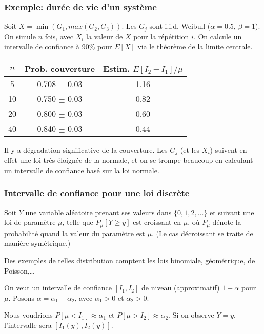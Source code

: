\documentclass[t,usepdftitle=false]{beamer}
\begin{document}
\begin{frame}
\frametitle{Exemple: durée de vie d'un système}

Soit $X = \min(G_1, max(G_2,G_3))$.
Les $G_j$ sont i.i.d. Weibull ($\alpha = 0.5$, $\beta= 1$).
On simule $n$ fois, avec $X_i$ la valeur de $X$ pour la répétition $i$.
On calcule un intervalle de confiance à 90\% pour $E[X]$ via le théorème de la limite centrale.
\begin{center}
\begin{tabular}{ccc}
\hline
$n$ & Prob. couverture & Estim. $E[I_2 - I_1]/\mu$ \\
\hline
5 & 0.708 $\pm$ 0.03 & 1.16 \\
10 & 0.750 $\pm$ 0.03 & 0.82 \\
20 & 0.800 $\pm$ 0.03 & 0.60 \\
40 & 0.840 $\pm$ 0.03 & 0.44 \\
\hline
\end{tabular}
\end{center}
Il y a dégradation significative de la couverture.
Les $G_j$ (et les $X_i$) suivent en effet une loi très éloignée de la normale, et on se
trompe beaucoup en calculant un intervalle de confiance basé sur la loi normale.

\end{frame}

\begin{frame}
\frametitle{Intervalle de confiance pour une loi discrète}

Soit ${Y}$ une variable aléatoire prenant ses valeurs dans
$\{0,1,2,\dots\}$ et suivant une loi de paramètre ${\mu}$, telle que
$P_\mu[Y \ge y]$ est croissant en $\mu$, où $P_\mu$ dénote la
probabilité quand la valeur du paramètre est $\mu$.
(Le cas décroissant se traite de manière symétrique.)

\mbox{}

Des exemples de telles distribution comptent les lois binomiale, géométrique, de Poisson,\ldots

\mbox{}

On veut un intervalle de confiance $[I_1,I_2]$ de niveau (approximatif) $1-\alpha$ pour $\mu$.
Posons $\alpha = \alpha_1 + \alpha_2$, avec $\alpha_1 > 0$
et $\alpha_2 > 0$.

\mbox{}

Nous voudrions
$P[\mu < I_1] \approx {\alpha_1}$ et $P[\mu > I_2] \approx{\alpha_2}$.
Si on observe $Y = y$, l'intervalle sera $[{I_1(y)}, {I_2(y)}]$.

\end{frame}
\end{document}

